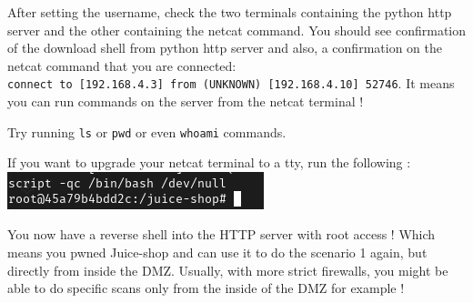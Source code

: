\documentclass[a4paper,11pt,singlespacing]{article}
\begin{document}
After setting the username, check the two terminals containing the
python http server and the other containing the netcat command. You
should see confirmation of the download shell from python http server
and also, a confirmation on the netcat command that you are connected:
\texttt{connect\ to\ {[}192.168.4.3{]}\ from\ (UNKNOWN)\ {[}192.168.4.10{]}\ 52746}.
It means you can run commands on the server from the netcat terminal !

Try running \texttt{ls} or \texttt{pwd} or even \texttt{whoami}
commands.

If you want to upgrade your netcat terminal to a tty, run the following
:
\includegraphics{Images/Image24.png}

You now have a reverse shell into the HTTP server with root access !
Which means you pwned Juice-shop and can use it to do the scenario 1
again, but directly from inside the DMZ. Usually, with more strict
firewalls, you might be able to do specific scans only from the inside
of the DMZ for example !
\end{document}
